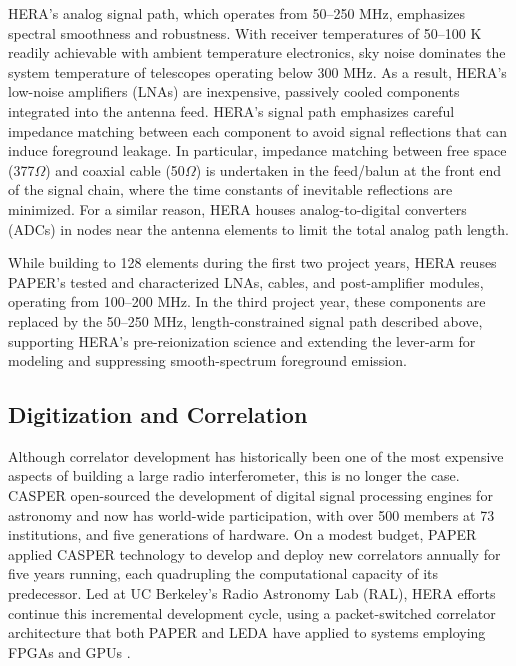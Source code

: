 \documentclass[preprint,11pt]{aastex}
\newcommand{\Mycitep}[1]{\citep{#1}}
\begin{document}
\noindent HERA's analog signal path, which operates from 50--250 MHz, emphasizes spectral smoothness and robustness.
With receiver temperatures of 50--100 K readily achievable with ambient temperature electronics, 
sky noise dominates the system temperature of telescopes operating below 300 MHz.  As a result,
HERA's low-noise amplifiers (LNAs) are inexpensive, passively cooled components integrated into the
antenna feed.  
HERA's signal path emphasizes careful impedance matching between each component to avoid signal reflections that can induce foreground leakage.
In particular, impedance matching between free space (377$\Omega$) and coaxial cable (50$\Omega$) is undertaken
in the feed/balun at the front end of the signal chain, where the time constants of inevitable reflections are
minimized.  For a similar reason, HERA houses analog-to-digital converters (ADCs) in nodes near the antenna elements
to limit the total analog path length.

While building to 128 elements during the first two project years, HERA reuses PAPER's tested and characterized 
LNAs, cables, and post-amplifier modules, operating
from 100--200 MHz.  In the third project year, these components are replaced by the 50--250 MHz, length-constrained signal
path described above, supporting HERA's pre-reionization science and extending the lever-arm for modeling and suppressing smooth-spectrum foreground emission.

\vspace{-20pt}
\subsection{Digitization and Correlation}
\label{sec:digital}
\vspace{-5pt}


\noindent Although correlator development has historically been one of the most 
expensive aspects of building a large radio interferometer, this is no longer the case.
CASPER \Mycitep{parsons_et_al2006}
open-sourced the development of digital signal processing engines for astronomy and
now has world-wide participation,
with over 500 members at 73 institutions, and 
five generations of hardware.
On a modest budget, PAPER applied CASPER technology to develop and deploy new correlators
annually for five years running, each quadrupling the computational capacity of its predecessor.
Led at UC Berkeley's Radio Astronomy Lab (RAL),
HERA efforts continue this incremental development cycle, using a packet-switched
correlator architecture \Mycitep{parsons_et_al2008} that both PAPER and LEDA have
applied to systems employing FPGAs and GPUs \citep{clark_et_al2011}.
\end{document}
